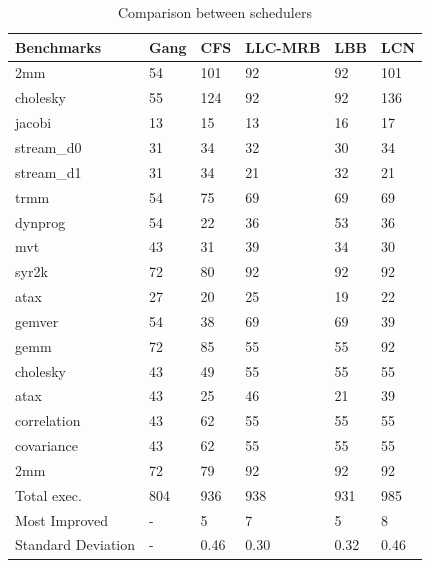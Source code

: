 \documentclass[diploma]{Styles/softlab-thesis}
\begin{document}
\Large
\begin{table}[h]
\begin{center}
\caption{Comparison between schedulers}
\begin{tabular}{ | l | l | l | l | l | l | }
    \hline
    Benchmarks & Gang & CFS & LLC-MRB & LBB & LCN \\ \hline
    2mm & 54 & \cellcolor{yellow}101 & 92 & 92 & \cellcolor{yellow}101 \\ \hline
    cholesky & 55 & 124 & 92 & 92 & \cellcolor{green}136 \\ \hline
    jacobi & 13 & 15 & 13 & 16 & \cellcolor{green}17 \\ \hline
    stream\_d0 & 31 & 34 & 32 & 30 & \cellcolor{green}34 \\ \hline
    stream\_d1 & 31 & \cellcolor{green}34 & 21 & 32 & 21 \\ \hline
    trmm & 54 & \cellcolor{green}75 & 69 & 69 & 69 \\ \hline
    dynprog & 54 & 22 & 36 & \cellcolor{green}53 & 36 \\ \hline
    mvt & 43 & 31 & \cellcolor{green}39 & 34 & 30 \\ \hline
    syr2k & 72 & 80 & \cellcolor{yellow}92 & \cellcolor{yellow}92 & \cellcolor{yellow}92 \\ \hline
    atax & 27 & 20 & \cellcolor{green}25 & 19 & 22 \\ \hline
    gemver & 54 & 38 & \cellcolor{yellow}69 & \cellcolor{yellow}69 & 39 \\ \hline
    gemm & 72 & 85 & 55 & 55 & \cellcolor{green}92 \\ \hline
    cholesky & 43 & 49 & \cellcolor{yellow}55 & \cellcolor{yellow}55 & \cellcolor{yellow}55 \\ \hline
    atax & 43 & 25 & \cellcolor{green}46 & 21 & 39 \\ \hline
    correlation & 43 & \cellcolor{green}62 & 55 & 55 & 55 \\ \hline
    covariance & 43 & \cellcolor{green}62 & 55 & 55 & 55 \\ \hline
    2mm & 72 & 79 & 92 & 92 & 92 \\ \hline
    Total exec. & 804 & 936 & 938 & 931 & \cellcolor{green}985 \\ \hline
    Most Improved & - & 5 & 7 & 5 & \cellcolor{green}8 \\ \hline
    Standard Deviation & - & 0.46 & \cellcolor{green}0.30 & 0.32 & 0.46 \\ \hline
\end{tabular}
\end{center}
\end{table}
\end{document}
